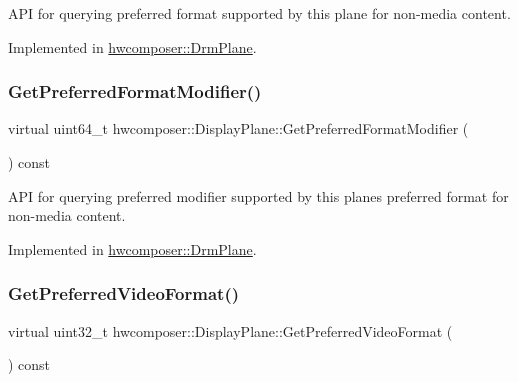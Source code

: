 A\+PI for querying preferred format supported by this plane for non-\/media content. 

Implemented in \mbox{\hyperlink{classhwcomposer_1_1DrmPlane_a3bca39231ec7b099980474b279c58ce8}{hwcomposer\+::\+Drm\+Plane}}.

\mbox{\label{classhwcomposer_1_1DisplayPlane_ad95d2bd823ccf74fe3deccad7352f672}} 
\subsubsection{\texorpdfstring{Get\+Preferred\+Format\+Modifier()}{GetPreferredFormatModifier()}}
{\footnotesize\ttfamily virtual uint64\+\_\+t hwcomposer\+::\+Display\+Plane\+::\+Get\+Preferred\+Format\+Modifier (\begin{DoxyParamCaption}{ }\end{DoxyParamCaption}) const\hspace{0.3cm}{\ttfamily [pure virtual]}}

A\+PI for querying preferred modifier supported by this plane\textquotesingle{}s preferred format for non-\/media content. 

Implemented in \mbox{\hyperlink{classhwcomposer_1_1DrmPlane_a185538f3aca7f84830f75f23efe551d6}{hwcomposer\+::\+Drm\+Plane}}.

\mbox{\label{classhwcomposer_1_1DisplayPlane_aab8aae5944b1107e4efc9d0d79c43c40}} 
\subsubsection{\texorpdfstring{Get\+Preferred\+Video\+Format()}{GetPreferredVideoFormat()}}
{\footnotesize\ttfamily virtual uint32\+\_\+t hwcomposer\+::\+Display\+Plane\+::\+Get\+Preferred\+Video\+Format (\begin{DoxyParamCaption}{ }\end{DoxyParamCaption}) const\hspace{0.3cm}{\ttfamily [pure virtual]}}

